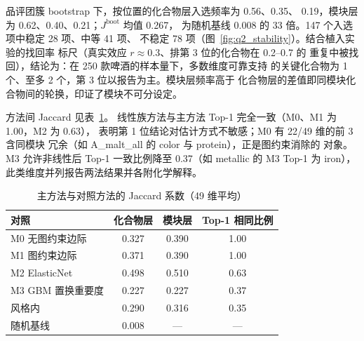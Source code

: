 \documentclass[12pt,a4paper]{article}
\begin{document}
品评团簇 bootstrap 下，按位置的化合物层入选频率为 0.56、0.35、
0.19，模块层为 0.62、0.40、0.21；$J^{\mathrm{boot}}$ 均值 0.267，
为随机基线 0.008 的 33 倍。147 个入选项中稳定 28 项、中等 41 项、
不稳定 78 项（图~\ref{fig:q2_stability}）。结合植入实验的找回率
标尺（真实效应 $r\approx0.3$、排第 3 位的化合物在 0.2--0.7 的
重复中被找回），结论为：在 250 款啤酒的样本量下，多数维度可靠支持
的关键化合物为 1 个、至多 2 个，第 3 位以报告为主。模块层频率高于
化合物层的差值即同模块化合物间的轮换，印证了模块不可分设定。


方法间 Jaccard 见表~\ref{tab:jaccard}。
线性族方法与主方法 Top-1 完全一致（M0、M1 为 1.00，M2 为 0.63），
表明第 1 位结论对估计方式不敏感；M0 有 22/49 维的前 3 含同模块
冗余（如 A\_malt\_all 的 color 与 protein），正是图约束消除的
对象。M3 允许非线性后 Top-1 一致比例降至 0.37（如 metallic 的
M3 Top-1 为 iron），此类维度并列报告两法结果并各附化学解释。

\begin{table}[!htbp]
  \centering\small
  \caption{主方法与对照方法的 Jaccard 系数（49 维平均）}
  \label{tab:jaccard}
  \begin{tabular}{lccc}
    \toprule
    对照 & 化合物层 & 模块层 & Top-1 相同比例 \\
    \midrule
    M0 无图约束边际 & 0.327 & 0.390 & 1.00 \\
    M1 图约束边际 & 0.371 & 0.390 & 1.00 \\
    M2 ElasticNet & 0.498 & 0.510 & 0.63 \\
    M3 GBM 置换重要度 & 0.227 & 0.227 & 0.37 \\
    风格内 & 0.290 & 0.316 & 0.35 \\
    随机基线 & 0.008 & --- & --- \\
    \bottomrule
  \end{tabular}
\end{table}

\end{document}
